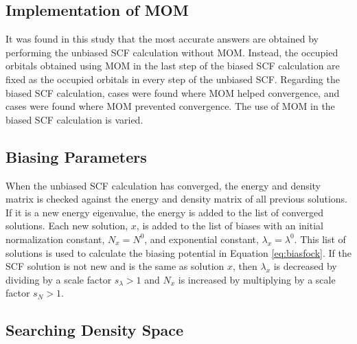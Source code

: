 \documentclass[final,3p,times,twocolumn]{elsarticle}
\begin{document}
\subsection{Implementation of MOM}\label{sec:alg-mom}
It was found in this study that the most accurate answers are obtained by performing the unbiased SCF calculation without MOM. Instead, the occupied orbitals obtained using MOM in the last step of the biased SCF calculation are fixed as the occupied orbitals in every step of the unbiased SCF. Regarding the biased SCF calculation, cases were found where MOM helped convergence, and cases were found where MOM prevented convergence. The use of MOM in the biased SCF calculation is varied.

\subsection{Biasing Parameters}\label{sec:alg-bias}

When the unbiased SCF calculation has converged, the energy and density matrix is checked against the energy and density matrix of all previous solutions. If it is a new energy eigenvalue, the energy is added to the list of converged solutions. Each new solution, $x$, is added to the list of biases with an initial normalization constant, $N_x=N^0$, and exponential constant, $\lambda_x=\lambda^0$. This list of solutions is used to calculate the biasing potential in Equation \eqref{eq:biasfock}. If the SCF solution is not new and is the same as solution $x$, then $\lambda_x$ is decreased by dividing by a scale factor $s_\lambda > 1$ and $N_x$ is increased by multiplying by a scale factor $s_N > 1$.

\subsection{Searching Density Space} \label{sec:alg-density}
\end{document}
